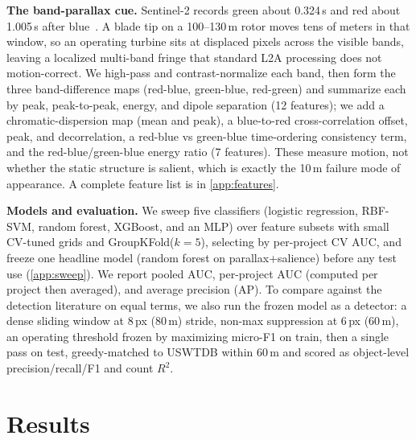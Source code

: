 \documentclass[10pt,twocolumn,letterpaper]{article}
\begin{document}
\textbf{The band-parallax cue.} Sentinel-2 records green about 0.324\,s and red about 1.005\,s after blue~\cite{nahrstedt}. A blade tip on a 100--130\,m rotor moves tens of meters in that window, so an operating turbine sits at displaced pixels across the visible bands, leaving a localized multi-band fringe that standard L2A processing does not motion-correct. We high-pass and contrast-normalize each band, then form the three band-difference maps (red-blue, green-blue, red-green) and summarize each by peak, peak-to-peak, energy, and dipole separation (12 features); we add a chromatic-dispersion map (mean and peak), a blue-to-red cross-correlation offset, peak, and decorrelation, a red-blue vs green-blue time-ordering consistency term, and the red-blue/green-blue energy ratio (7 features). These measure motion, not whether the static structure is salient, which is exactly the 10\,m failure mode of appearance. A complete feature list is in \cref{app:features}.

\textbf{Models and evaluation.} We sweep five classifiers (logistic regression, RBF-SVM, random forest, XGBoost, and an MLP) over feature subsets with small CV-tuned grids and GroupKFold($k{=}5$), selecting by per-project CV AUC, and freeze one headline model (random forest on parallax+salience) before any test use (\cref{app:sweep}). We report pooled AUC, per-project AUC (computed per project then averaged), and average precision (AP). To compare against the detection literature on equal terms, we also run the frozen model as a detector: a dense sliding window at 8\,px (80\,m) stride, non-max suppression at 6\,px (60\,m), an operating threshold frozen by maximizing micro-F1 on train, then a single pass on test, greedy-matched to USWTDB within 60\,m and scored as object-level precision/recall/F1 and count $R^2$.

\section{Results}
\end{document}
